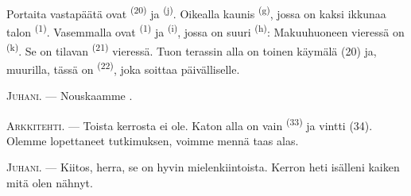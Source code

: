 \VUsaut{3.0mm}
\VUsaut{3.0mm}

Portaita vastapäätä ovat  \textsuperscript{(20)} ja
 \textsuperscript{(j)}. Oikealla kaunis 
\textsuperscript{(g)}, jossa on kaksi ikkunaa talon 
\textsuperscript{(1)}. Vasemmalla ovat 
\textsuperscript{(1)} ja  \textsuperscript{(i)}, jossa on
suuri  \textsuperscript{(h)}: Makuuhuoneen vieressä on
 \textsuperscript{(k)}. Se on tilavan 
\textsuperscript{(21)} vieressä. Tuon terassin alla on toinen käymälä (20) ja,
muurilla, tässä on  \textsuperscript{(22)}, joka soittaa
päivälliselle.

\textsc{Juhani}. --- Nouskaamme .

\textsc{Arkkitehti}. --- Toista kerrosta ei ole. Katon alla on vain
 \textsuperscript{(33)} ja vintti (34). Olemme
lopettaneet tutkimuksen, voimme mennä taas alas.

\textsc{Juhani}. --- Kiitos, herra, se on hyvin mielenkiintoista. Kerron heti
isälleni kaiken mitä olen nähnyt.
\VUsaut{4.0mm}
\VUfilet{22mm}
